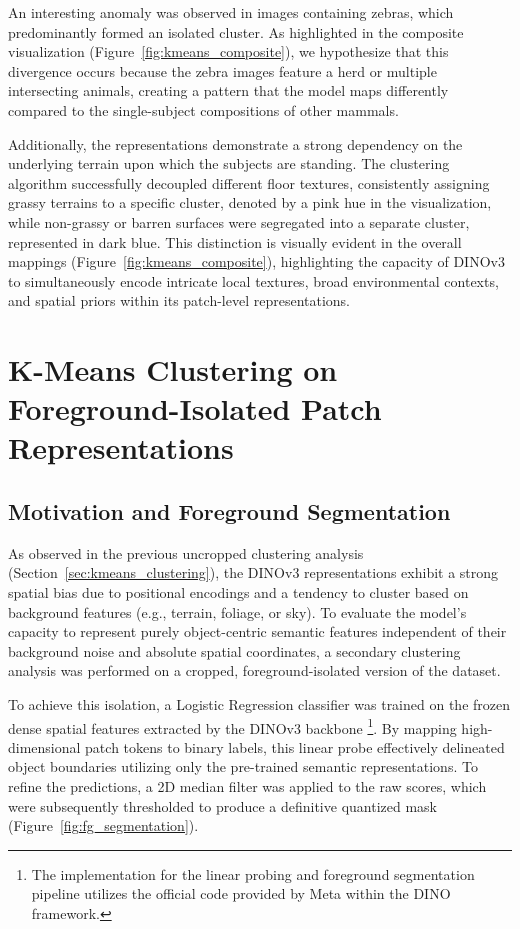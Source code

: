 \documentclass[oneside]{ctuthesis}
\begin{document}
An interesting anomaly was observed in images containing zebras, which predominantly formed an isolated cluster. As highlighted in the composite visualization (Figure~\ref{fig:kmeans_composite}), we hypothesize that this divergence occurs because the zebra images feature a herd or multiple intersecting animals, creating a pattern that the model maps differently compared to the single-subject compositions of other mammals.

Additionally, the representations demonstrate a strong dependency on the underlying terrain upon which the subjects are standing. The clustering algorithm successfully decoupled different floor textures, consistently assigning grassy terrains to a specific cluster, denoted by a pink hue in the visualization, while non-grassy or barren surfaces were segregated into a separate cluster, represented in dark blue. This distinction is visually evident in the overall mappings (Figure~\ref{fig:kmeans_composite}), highlighting the capacity of DINOv3 to simultaneously encode intricate local textures, broad environmental contexts, and spatial priors within its patch-level representations.

\section{K-Means Clustering on Foreground-Isolated Patch Representations}
\label{sec:kmeans_cropped_clustering}

\subsection{Motivation and Foreground Segmentation}
\label{sec:kmeans_cropped_motivation}

As observed in the previous uncropped clustering analysis (Section~\ref{sec:kmeans_clustering}), the DINOv3 representations exhibit a strong spatial bias due to positional encodings and a tendency to cluster based on background features (e.g., terrain, foliage, or sky). To evaluate the model's capacity to represent purely object-centric semantic features independent of their background noise and absolute spatial coordinates, a secondary clustering analysis was performed on a cropped, foreground-isolated version of the dataset.

To achieve this isolation, a Logistic Regression classifier was trained on the frozen dense spatial features extracted by the DINOv3 backbone \cite{oquab2024dinov2learningrobustvisual}\footnote{The implementation for the linear probing and foreground segmentation pipeline utilizes the official code provided by Meta within the DINO framework.}. By mapping high-dimensional patch tokens to binary labels, this linear probe effectively delineated object boundaries utilizing only the pre-trained semantic representations. To refine the predictions, a 2D median filter was applied to the raw scores, which were subsequently thresholded to produce a definitive quantized mask (Figure~\ref{fig:fg_segmentation}).
\end{document}
